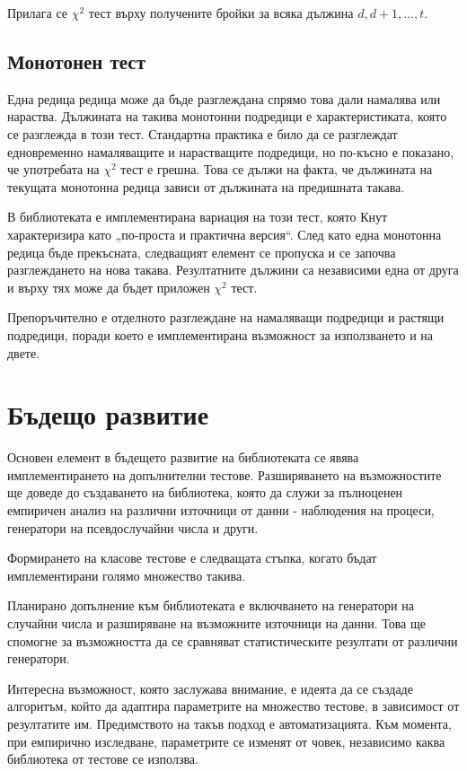 \documentclass[12pt,a4paper]{article}
\theoremstyle{plain}
\begin{document}
        Прилага се $\chi^2$ тест върху получените бройки за всяка дължина $d, d+1, \dots, t$.

    \subsection{Монотонен тест}

        Една редица редица може да бъде разглеждана спрямо това дали намалява или нараства. Дължината на такива монотонни подредици е характеристиката, която се разглежда в този тест. Стандартна практика е било да се разглеждат едновременно намаляващите и нарастващите подредици, но по-късно е показано, че употребата на $\chi^2$ тест е грешна. \cite{UpsDowns} Това се дължи на факта, че дължината на текущата монотонна редица зависи от дължината на предишната такава.

        В библиотеката е имплементирана вариация на този тест, която Кнут характеризира като „по-проста и практична версия“. След като една монотонна редица бъде прекъсната, следващият елемент се пропуска и се започва разглеждането на нова такава. Резултатните дължини са независими една от друга и върху тях може да бъдет приложен $\chi^2$ тест. \cite{KnuthV2}
        
        Препоръчително е отделното разглеждане на намаляващи подредици и растящи подредици, поради което е имплементирана възможност за използването и на двете.

\section{Бъдещо развитие}
    
    Основен елемент в бъдещето развитие на библиотеката се явява имплементирането на допълнителни тестове. Разширяването на възможностите ще доведе до създаването на библиотека, която да служи за пълноценен емпиричен анализ на различни източници от данни - наблюдения на процеси, генератори на псевдослучайни числа и други.

    Формирането на класове тестове е следващата стъпка, когато бъдат имплементирани голямо множество такива.

    Планирано допълнение към библиотеката е включването на генератори на случайни числа и разширяване на възможните източници на данни. Това ще спомогне за възможността да се сравняват статистическите резултати от различни генератори. 

    Интересна възможност, която заслужава внимание, е идеята да се създаде алгоритъм, който да адаптира параметрите на множество тестове, в зависимост от резултатите им. Предимството на такъв подход е автоматизацията. Към момента, при емпирично изследване, параметрите се изменят от човек, независимо каква библиотека от тестове се използва.

\pagebreak


\end{document}
